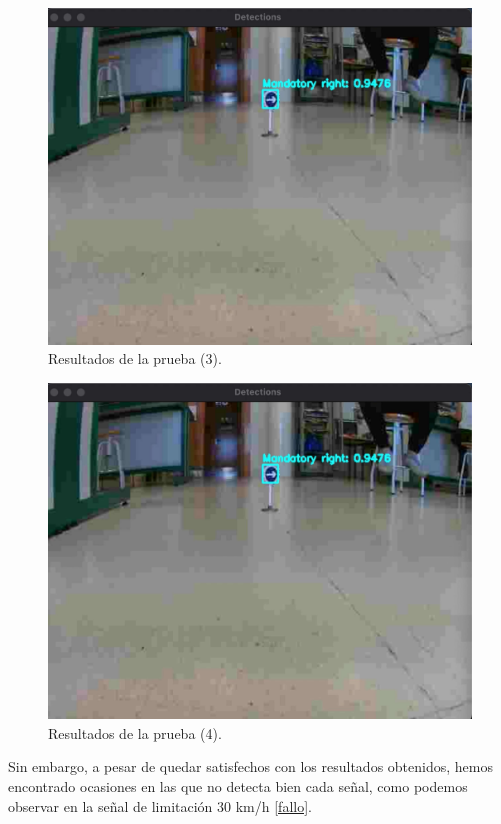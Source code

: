 \begin{figure}[H]
    \centering
 	\includegraphics[width=\textwidth]{Imagenes/IA/YoloCNN_coche3.pdf}
    \caption{Resultados de la prueba (3).}
    \label{c3}
\end{figure}

\begin{figure}[H]
    \centering
 	\includegraphics[width=\textwidth]{Imagenes/IA/YoloCNN_coche3.pdf}
    \caption{Resultados de la prueba (4).}
    \label{c4}
\end{figure}

Sin embargo, a pesar de quedar satisfechos con los resultados obtenidos, hemos encontrado ocasiones en las que no detecta bien cada señal, como podemos observar en la señal de limitación 30 km/h \ref{fallo}. \\

